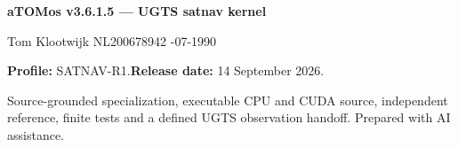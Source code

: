 \documentclass[11pt,a4paper]{article}
\begin{document}
\normalsize
\vfill
\begin{panel}
\textbf{aTOMos v3.6.1.5 --- UGTS satnav kernel}\par
Tom Klootwijk \quad NL200678942 -07-1990\par
\textbf{Profile:} SATNAV-R1.\quad\textbf{Release date:} 14 September 2026.\par
Source-grounded specialization, executable CPU and CUDA source, independent reference,
finite tests and a defined UGTS observation handoff. Prepared with AI assistance.
\end{panel}
\end{document}
